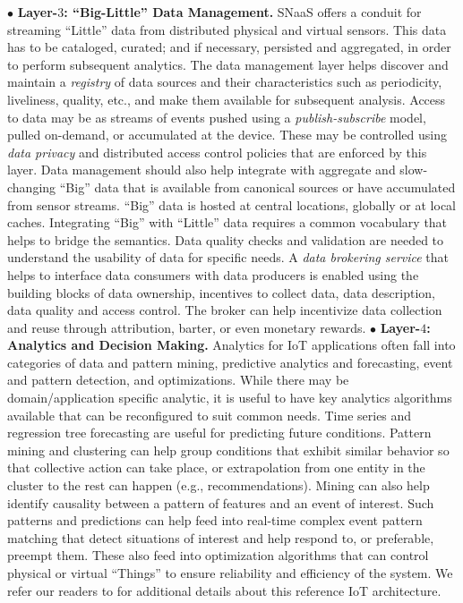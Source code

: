 \documentclass[conference]{IEEEtran}
\begin{document}
\vspace{1mm}
\newline
\noindent
$\bullet$ \textbf{Layer-$3$: ``Big-Little'' Data Management.}
SNaaS offers a conduit for streaming ``Little'' data from distributed physical and virtual sensors. 
This data has to be cataloged, curated; and if necessary, persisted and aggregated, in order to perform subsequent analytics. 
The data management layer helps discover and maintain a \emph{registry} of data sources and their characteristics such as periodicity, liveliness, quality, etc., and make them available for subsequent analysis. 
Access to data may be as streams of events pushed using a \emph{publish-subscribe} model, pulled on-demand, or accumulated at the device. These may be controlled using \emph{data privacy} and distributed access control policies that are enforced by this layer. 
\newline
\indent
Data management should also help integrate with aggregate and slow-changing ``Big'' data that is available from canonical sources or have accumulated from sensor streams. 
``Big'' data is hosted at central locations, globally or at local caches. Integrating ``Big'' with ``Little'' data requires a common vocabulary that helps to bridge the semantics.
Data quality checks and validation are needed to understand the usability of data for specific needs.
\newline
\indent
A \emph{data brokering service} that helps to interface data consumers with data producers is enabled using the building blocks of data ownership, incentives to collect data, data description, data quality and access control. 
The broker can help incentivize data collection and reuse through attribution, barter, or even monetary rewards.
\vspace{1mm}
\newline
\newline
\noindent
$\bullet$ \textbf{Layer-$4$: Analytics and Decision Making.}
Analytics for IoT applications often fall into categories of data and pattern mining, predictive analytics and forecasting, event and pattern detection, and optimizations. 
While there may be domain/application specific analytic, it is useful to have key analytics algorithms available that can be reconfigured to suit common needs. 
Time series and regression tree forecasting are useful for predicting future conditions.
Pattern mining and clustering can help group conditions that exhibit similar behavior so that collective action can take place, or extrapolation from one entity in the cluster to the rest can happen (e.g., recommendations)\cite{ddmm2011}.
Mining can also help identify causality between a pattern of features and an event of interest.
Such patterns and predictions can help feed into real-time complex event pattern matching\cite{govindarajanSJM14} that detect situations of interest and help
respond to, or preferable, preempt them. 
These also feed into optimization algorithms that can control physical or virtual ``Things'' to ensure reliability and efficiency of the system.
\newline
\indent
We refer our readers to \cite{IoT-IISc,IoT-India} for additional details about this reference IoT architecture. 
\end{document}
